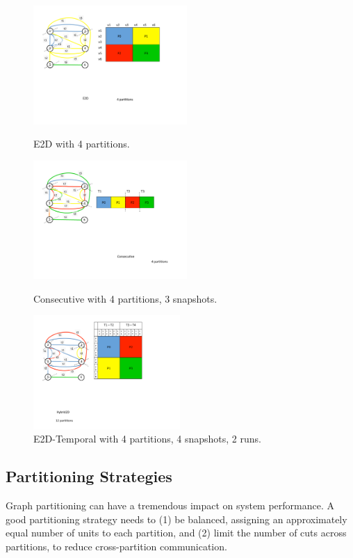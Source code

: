 \begin{figure}
\begin{minipage}{2.3in}
\centering
\includegraphics[width=2.3in]{figs/E2D_1.pdf}
\caption{E2D with 4 partitions.}
\label{fig:e2d}
\end{minipage}
\begin{minipage}{2.3in}
\centering
\includegraphics[width=2.3in]{figs/Consecutive_1.pdf}
\caption{Consecutive with 4 partitions, 3 snapshots.}
\label{fig:consecutive}
\end{minipage}
\begin{minipage}{2.2in}
\centering
\includegraphics[width=2.2in]{figs/Hybrid2D_1.pdf}
\caption{E2D-Temporal with 4 partitions, 4 snapshots, 2 runs.}
\label{fig:hybrid2d}
\end{minipage}
\end{figure}

\subsection{Partitioning Strategies}  
\label{sec:sys:partition}

Graph partitioning can have a tremendous impact on system performance.
A good partitioning strategy needs to (1) be balanced, assigning an
approximately equal number of units to each partition, and (2) limit
the number of cuts across partitions, to reduce cross-partition
communication.  

